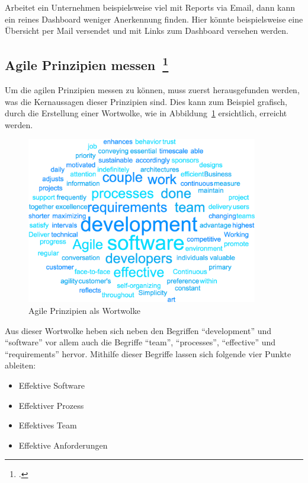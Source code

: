 Arbeitet ein Unternehmen beispielsweise viel mit Reports via Email, dann kann ein reines Dashboard weniger Anerkennung finden. Hier könnte beispielsweise eine Übersicht per Mail versendet und mit Links zum Dashboard versehen werden.

\subsection[Agile Prinzipien messen]{Agile Prinzipien messen~\footcite[vgl.][S.201ff]{davis_agile_2015}}

Um die agilen Prinzipien messen zu können, muss zuerst herausgefunden werden, was die Kernaussagen dieser Prinzipien sind.
Dies kann zum Beispiel grafisch, durch die Erstellung einer Wortwolke, wie in Abbildung~\ref{fig:wordcloud_principles} ersichtlich, erreicht werden.

\begin{savenotes}
  \begin{figure}[H] 
    \centering
    \includegraphics[width=0.9\textwidth]{img/principles-wordcloud.png}
    \caption{Agile Prinzipien als Wortwolke}\label{fig:wordcloud_principles}
  \end{figure}
\end{savenotes}

Aus dieser Wortwolke heben sich neben den Begriffen ``development'' und ``software'' vor allem auch die Begriffe ``team'', ``processes'', ``effective'' und ``requirements'' hervor.
Mithilfe dieser Begriffe lassen sich folgende vier Punkte ableiten:

\begin{itemize}[noitemsep]
  \item Effektive Software
  \item Effektiver Prozess
  \item Effektives Team 
  \item Effektive Anforderungen 
\end{itemize}

